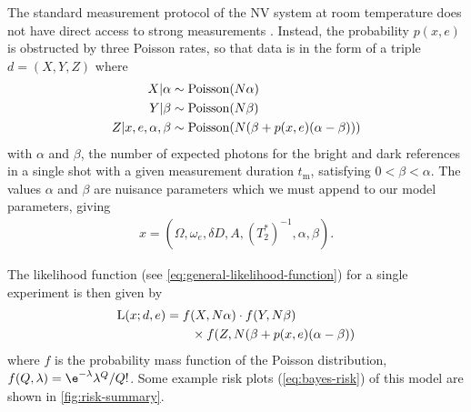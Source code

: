 \documentclass[aps,nofootinbib,twocolumn,superscriptaddress]{revtex4}
\newcommand{\mps}{x}
\newcommand{\eps}{e}
\newcommand{\data}{d}
\newcommand{\tm}{t_\text{m}}
\begin{document}
The standard measurement protocol of the NV system at room
temperature does not have direct access to strong measurements
\cite{hincks_statistical_2018}.
Instead, the probability $p(\mps,\eps)$ is obstructed by three Poisson
rates, so that data is in the form of a triple $\data=(X,Y,Z)$
where
\begin{subequations}
\begin{align}
    X|\alpha
        & \sim\poissondist(N\alpha) \\
    Y|\beta
        & \sim\poissondist(N\beta) \\
    Z|\mps,\eps,\alpha,\beta
        & \sim\poissondist(N(\beta+p(\mps,\eps)(\alpha-\beta)))
\end{align}
\label{eq:nv-measurement}%
\end{subequations}
with $\alpha$ and $\beta$,
the number of expected
photons for the bright and dark references in a single shot with a
given measurement duration $\tm$,
 satisfying $0<\beta<\alpha$.
The values $\alpha$ and $\beta$ are nuisance parameters which we
must append to our model parameters, giving
\begin{align}
    \mps=(\Omega,\omega_e,\delta D,A,(T_2^*)^{-1},\alpha,\beta).
    \label{eq:nv-model-parameters}
\end{align}

The likelihood function (see \autoref{eq:general-likelihood-function})
for a single experiment is then given by
\begin{align}
    \Lhood(\mps;\data,\eps)
        &= f(X,N\alpha)
            \cdot f(Y, N\beta) \nonumber \\
            &\quad\quad\times f(Z, N(\beta+p(\mps,\eps)(\alpha-\beta))
    \label{eq:likelihood-function}
\end{align}
where $f$ is the probability mass function of the Poisson distribution,
$f(Q,\lambda) = \e^{-\lambda}\lambda^Q/Q!$.
Some example risk plots (\autoref{eq:bayes-risk}) of this model
are shown in \autoref{fig:risk-summary}.
\end{document}
